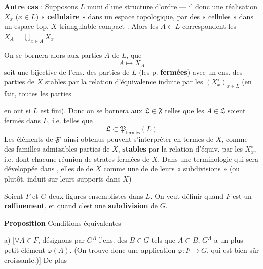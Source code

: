 \documentclass[11pt,a4paper]{article}
\begin{document}
\textbf{Autre cas} : Supposons $L$ muni d'une structure d'ordre — il  donc une réalisation  $X_x$ ($x \in L$) « \textbf{cellulaire} » dans un espace topologique, par des « cellules » dans un espace top. $X$ triangulable compact . Alors \struck{\ill{}} les $A \subset L$ correspondent les $X_A = \bigcup_{x \in A} X_x$.


On se bornera alors aux parties $A$ de $L$,   que \struck{$\ill{}$}
\[
  A \longmapsto X_A
\]
soit une  bijective de l'ens. des parties  de $L$ (les p. \textbf{fermées}) avec un ens. \struck{\ill{}} des parties  de $X$ \struck{\ill{}} stables par la relation d'équivalence induite  par les $(X_x^{\circ})_{x \in L}$ (en fait, toutes les parties

en ont si $L$ est fini). Donc on se bornera aux $\mathfrak{L} \in \mathfrak{F}$ telles que les $A \in \mathfrak{L}$ soient fermés dans $L$, i.e. telles que
\[
  \mathfrak{L} \subset \mathfrak{P}_{\text{fermés}}(L)
\]
Les éléments de $\mathfrak{F}'$ ainsi obtenus peuvent s'interpréter en termes de $X$, comme des familles admissibles   parties  de $X$, \textbf{stables} par la relation d'équiv.    par les $X_x^{\circ}$, i.e. dont chacune  réunion de strates fermées de $X$. \struck{\ill{}} Dans une terminologie qui sera développée  \struck{\ill{}} dans \struck{\ill{}}   , elles   de  de $X$ comme une  de   de leurs « subdivisions » (ou plutôt, induit sur leurs supports dans $X$)

Soient $F$ et $G$ deux figures ensemblistes dans $L$. On veut définir quand $F$ est un \textbf{raffinement}, et quand c'est une \textbf{subdivision} de $G$.

\textbf{Proposition} Conditions équivalentes

a) [$\forall A \in F$, désignons par $G^{A}$ l'ens. des $B \in G$ tels que $A \subset B$, $G^{A}$ a un plus petit élément $\varphi(A)$. (On trouve donc une application $\varphi : F \to G$, qui est bien sûr croissante.)] De plus
\end{document}
